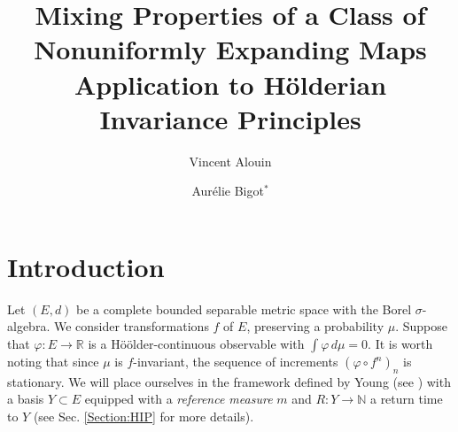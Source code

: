 \documentclass{ws-sd}
\title{Mixing Properties of a Class of Nonuniformly Expanding Maps Application to H\"olderian Invariance Principles}
\date{ }
\author{Vincent Alouin}
\author{Aur\'elie Bigot$^{\ast}$}
\newcommand{\R}{\mathbb{R}}
\begin{document}
\maketitle

{\let\thefootnote\relax{}}

\begin{history}
\end{history}



\section{Introduction}
    \label{Section:intro}

Let $(E, d)$ be a complete bounded separable metric space with the Borel $\sigma$-algebra. We consider transformations $f$ of $E$, preserving a probability $\mu$. Suppose that $\varphi : E \to \R$ is a Hö\"older-continuous observable with $\int \varphi \, d\mu = 0$. It is worth noting that since $\mu$ is $f$-invariant, the sequence of increments $(\varphi \circ f^n)_n$ is stationary. We will place ourselves in the framework defined by Young (see \cite{27}) with  a basis $Y \subset E$ equipped with a \textit{reference measure} $m$ and $R : Y \to \mathbb N$ a return time to $Y$ (see Sec. \ref{Section:HIP} for more details).
\\
\end{document}
